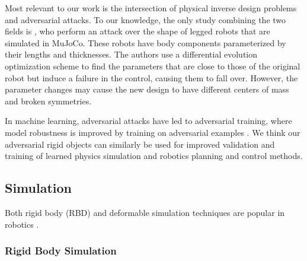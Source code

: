 Most relevant to our work is the intersection of physical inverse design problems and adversarial attacks. To our knowledge, the only study combining the two fields is \citet{azakami2022adversarial}, who perform an attack over the shape of legged robots that are simulated in MuJoCo. These robots have body components parameterized by their lengths and thicknesses. The authors use a differential evolution optimization scheme to find the parameters that are close to those of the original robot but induce a failure in the control, causing them to fall over. However, the parameter changes may cause the new design to have different centers of mass and broken symmetries.

In machine learning, adversarial attacks have led to adversarial training, where model robustness is improved by training on adversarial examples \cite{ijcai2021p591, QIAN2022108889}. We think our adversarial rigid objects can similarly be used for improved validation and training of learned physics simulation and robotics planning and control methods.

\subsection{Simulation}
Both rigid body (RBD) and deformable simulation techniques are popular in robotics \cite{liu2021role}.

\subsubsection{Rigid Body Simulation}

